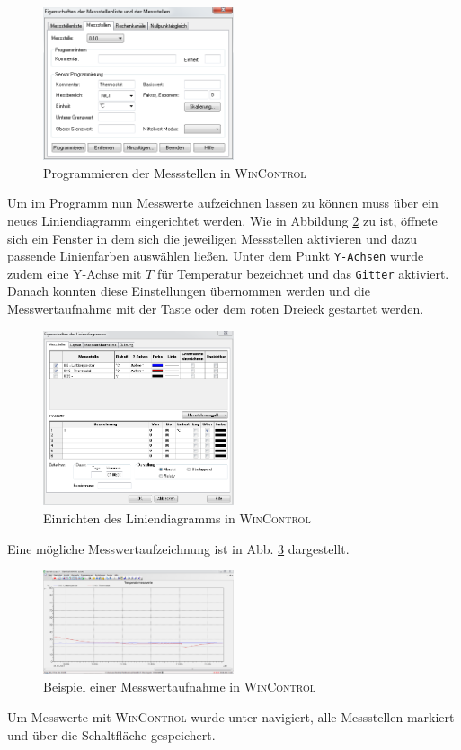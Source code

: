 \documentclass[a4paper, 11pt, draft=false]{scrartcl}
\begin{document}
	\begin{figure}[h!]
		\centering
		\includegraphics[width=0.5\textwidth]{img/almemo_2}
		\caption{Programmieren der Messstellen in \textsc{WinControl}}
		\label{fig:almemo_programm}
	\end{figure}
	\FloatBarrier
	
	Um im Programm nun Messwerte aufzeichnen lassen zu können muss über  ein neues Liniendiagramm eingerichtet werden. Wie in Abbildung \ref{fig:almemo_linien} zu ist, öffnete sich ein Fenster in dem sich die jeweiligen Messstellen aktivieren und dazu passende Linienfarben auswählen ließen. Unter dem Punkt \texttt{Y-Achsen} wurde zudem eine Y-Achse mit $T$ für Temperatur bezeichnet und das \texttt{Gitter} aktiviert. Danach konnten diese Einstellungen übernommen werden und die Messwertaufnahme mit der Taste  oder dem roten Dreieck gestartet werden.
	\begin{figure}[h!]
		\centering
		\includegraphics[width=0.5\textwidth]{img/almemo_3}
		\caption{Einrichten des Liniendiagramms in \textsc{WinControl}}
		\label{fig:almemo_linien}
	\end{figure}
	\FloatBarrier
	Eine mögliche Messwertaufzeichnung ist in Abb. \ref{fig:almemo_beispiel} dargestellt.
	\begin{figure}[h!]
		\centering
		\includegraphics[width=0.5\textwidth]{img/almemo_4}
		\caption{Beispiel einer Messwertaufnahme in \textsc{WinControl}}
		\label{fig:almemo_beispiel}
	\end{figure}
	\FloatBarrier
	Um Messwerte mit \textsc{WinControl} wurde unter  navigiert, alle Messstellen markiert und über die Schaltfläche  gespeichert.
	
\end{document}
